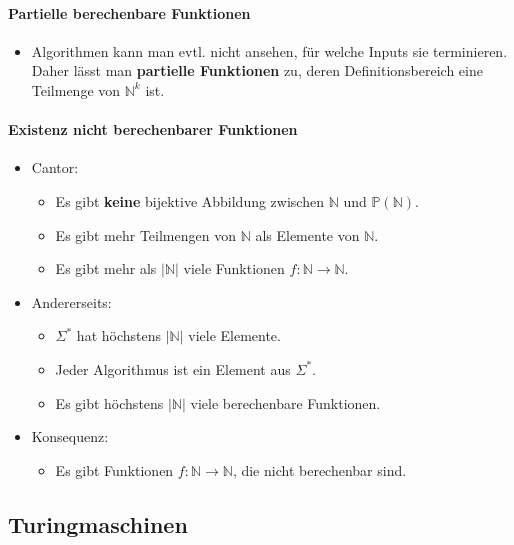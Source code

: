 \documentclass{scrartcl}
\begin{document}
\paragraph{Partielle berechenbare Funktionen}

\begin{itemize}
	\item Algorithmen kann man evtl. nicht ansehen, für welche Inputs sie terminieren. Daher lässt man \textbf{partielle Funktionen} zu, deren Definitionsbereich eine Teilmenge von $\mathbb{N}^k$ ist.
\end{itemize}

\paragraph{Existenz nicht berechenbarer Funktionen}

\begin{itemize}
	\item Cantor:
	\begin{itemize}
		\item Es gibt \textbf{keine} bijektive Abbildung zwischen $\mathbb{N}$ und $\mathbb{P}(\mathbb{N})$.
		\item Es gibt mehr Teilmengen von $\mathbb{N}$ als Elemente von $\mathbb{N}$.
		\item Es gibt mehr als $|\mathbb{N}|$ viele Funktionen $f: \mathbb{N} \rightarrow \mathbb{N}$.
	\end{itemize}
	\item Andererseits:
	\begin{itemize}
		\item $\Sigma^*$ hat höchstens $|\mathbb{N}|$ viele Elemente.
		\item Jeder Algorithmus ist ein Element aus $\Sigma^*$.
		\item Es gibt höchstens $|\mathbb{N}|$ viele berechenbare Funktionen.
	\end{itemize}
	\item Konsequenz:
	\begin{itemize}
		\item Es gibt Funktionen $f: \mathbb{N} \rightarrow \mathbb{N}$, die nicht berechenbar sind.
	\end{itemize}
\end{itemize}

\subsection{Turingmaschinen}
\end{document}
